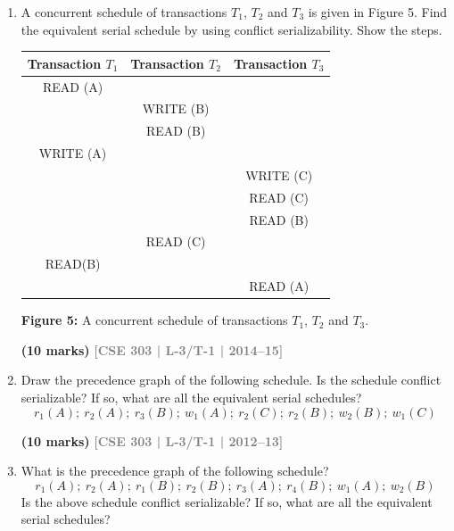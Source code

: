 \documentclass[12pt]{article}
\newcommand{\yr}[1]{\hfill\textcolor{gray}{\small\textbf{[#1]}}}
\newcommand{\mk}[1]{\textcolor{orange!70!black}{\small\textbf{(#1 marks)}}}
\begin{document}
\begin{enumerate}
\begin{center}
    \vspace{0.4cm}
    \textbf{Figure:} Concurrent schedule of four transactions
\end{center}
\mk{20} \yr{CSE 303 | L-3/T-1 | 2015--16}


\item A concurrent schedule of transactions $T_1$, $T_2$ and $T_3$ is given in Figure 5. Find the equivalent serial schedule by using conflict serializability. Show the steps.

\begin{center}
  \renewcommand{\arraystretch}{1.4} %
    \begin{tabular}{c|c|c}
        \textbf{Transaction $T_1$} & \textbf{Transaction $T_2$} & \textbf{Transaction $T_3$} \\ \hline
        READ (A) &           &           \\ \hline
                 & WRITE (B) &           \\ \hline
                 & READ (B)  &           \\ \hline
        WRITE (A)&           &           \\ \hline
                 &           & WRITE (C) \\ \hline
                 &           & READ (C)  \\ \hline
                 &           & READ (B)  \\ \hline
                 & READ (C)  &           \\ \hline
        READ(B)  &           &           \\ \hline
                 &           & READ (A)  \\ \hline
    \end{tabular}
    
    \vspace{0.4cm}
    \textbf{Figure 5:} A concurrent schedule of transactions $T_1$, $T_2$ and $T_3$.
\end{center}

\mk{10} \yr{CSE 303 | L-3/T-1 | 2014--15}


\item Draw the precedence graph of the following schedule. Is the schedule conflict serializable? If so, what are all the equivalent serial schedules?
\[r_1(A);\ r_2(A);\ r_3(B);\ w_1(A);\ r_2(C);\ r_2(B);\ w_2(B);\ w_1(C)\]

\mk{10} \yr{CSE 303 | L-3/T-1 | 2012--13}


\item What is the precedence graph of the following schedule?
\[r_1(A);\ r_2(A);\ r_1(B);\ r_2(B);\ r_3(A);\ r_4(B);\ w_1(A);\ w_2(B)\]
Is the above schedule conflict serializable? If so, what are all the equivalent serial schedules?


\end{enumerate}
\end{document}
